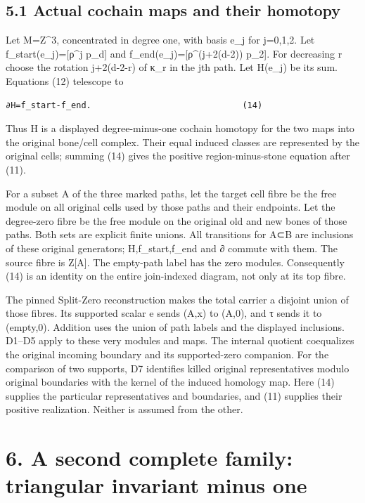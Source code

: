 \documentclass[
  10pt,
]{scrreprt}
\begin{document}
\subsection{5.1 Actual cochain maps and their
homotopy}\label{edition-10-section-12}

Let M=Z\^{}3, concentrated in degree one, with basis e\_j for j=0,1,2.
Let f\_start(e\_j)={[}ρ\^{}j p\_d{]} and f\_end(e\_j)={[}ρ\^{}(j+2(d-2))
p\_2{]}. For decreasing r choose the rotation j+2(d-2-r) of κ\_r in the
jth path. Let H(e\_j) be its sum. Equations (12) telescope to

\begin{verbatim}
∂H=f_start-f_end.                              (14)
\end{verbatim}

Thus H is a displayed degree-minus-one cochain homotopy for the two maps
into the original bone/cell complex. Their equal induced classes are
represented by the original cells; summing (14) gives the positive
region-minus-stone equation after (11).

For a subset A of the three marked paths, let the target cell fibre be
the free module on all original cells used by those paths and their
endpoints. Let the degree-zero fibre be the free module on the original
old and new bones of those paths. Both sets are explicit finite unions.
All transitions for A⊂B are inclusions of these original generators;
H,f\_start,f\_end and ∂ commute with them. The source fibre is Z{[}A{]}.
The empty-path label has the zero modules. Consequently (14) is an
identity on the entire join-indexed diagram, not only at its top fibre.

The pinned Split-Zero reconstruction makes the total carrier a disjoint
union of those fibres. Its supported scalar e sends (A,x) to (A,0), and
τ sends it to (empty,0). Addition uses the union of path labels and the
displayed inclusions. D1--D5 apply to these very modules and maps. The
internal quotient coequalizes the original incoming boundary and its
supported-zero companion. For the comparison of two supports, D7
identifies killed original representatives modulo original boundaries
with the kernel of the induced homology map. Here (14) supplies the
particular representatives and boundaries, and (11) supplies their
positive realization. Neither is assumed from the other.

\section{6. A second complete family: triangular invariant minus
one}\label{edition-10-section-13}
\end{document}
